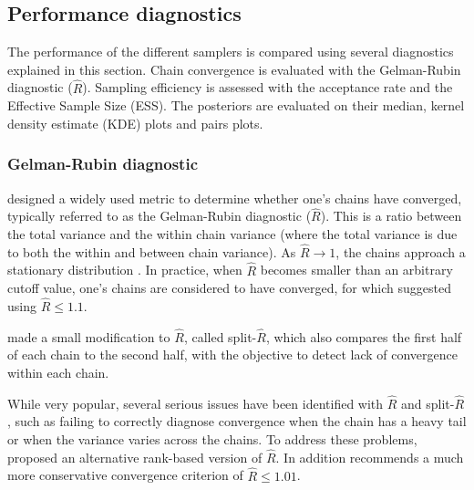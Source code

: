 \subsection{Performance diagnostics}\label{mcmc eval}
The performance of the different samplers is compared using several diagnostics explained in this section. Chain convergence is evaluated with the Gelman-Rubin diagnostic ($\hat{R}$). Sampling efficiency is assessed with the acceptance rate and the Effective Sample Size (ESS). The posteriors are evaluated on their median, kernel density estimate (KDE) plots and pairs plots. 

\subsubsection{Gelman-Rubin diagnostic}
\cite{gelman1992inference} designed a widely used metric to determine whether one's chains have converged, typically referred to as the Gelman-Rubin diagnostic ($\hat{R}$). This is a ratio between the total variance and the within chain variance (where the total variance is due to both the within and between chain variance).  %
As $\hat{R} \to 1$, the chains approach a stationary distribution \citep{lambert2018student}. In practice, when $\hat{R}$ becomes smaller than an arbitrary cutoff value, one's chains are considered to have converged, for which \cite{gelman1992inference} suggested using $\hat{R} \leq 1.1$. 

\cite{gelman2021bayesian} made a small modification to $\hat{R}$, called split-$\hat{R}$, which also compares the first half of each chain to the second half, with the objective to detect lack of convergence within each chain. %

While very popular, several serious issues have been identified with $\hat{R}$ and split-$\hat{R}$, such as failing to correctly diagnose convergence when the chain has a heavy tail or when the variance varies across the chains. To address these problems, \cite{vehtari2021rank} proposed an alternative rank-based version of $\hat{R}$. In addition \cite{vehtari2021rank} recommends a much more conservative convergence criterion of $\hat{R} \leq 1.01$. 

